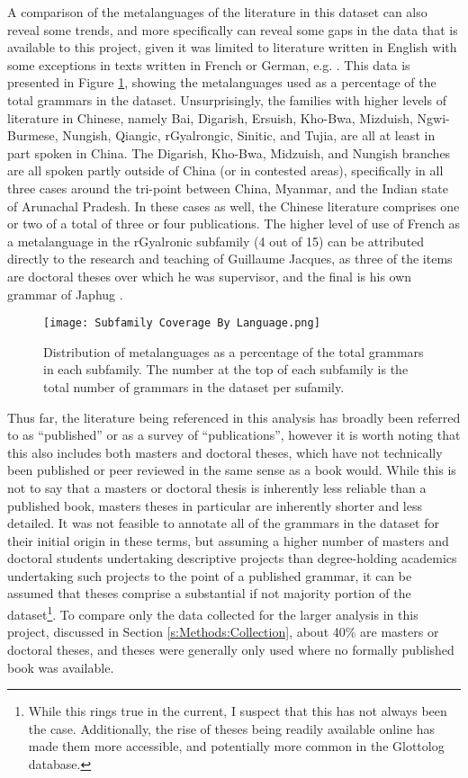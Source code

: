 A comparison of the metalanguages of the literature in this dataset can also reveal some trends, and more specifically can reveal some gaps in the data that is available to this project, given it was limited to literature written in English with some exceptions in texts written in French or German, e.g. . This data is presented in Figure \ref{f:Description:SubfamilyCoverageByLanguage}, showing the metalanguages used as a percentage of the total grammars in the dataset. Unsurprisingly, the families with higher levels of literature in Chinese, namely Bai, Digarish, Ersuish, Kho-Bwa, Mizduish, Ngwi-Burmese, Nungish, Qiangic, rGyalrongic, Sinitic, and Tujia, are all at least in part spoken in China. The Digarish, Kho-Bwa, Midzuish, and Nungish branches are all spoken partly outside of China (or in contested areas), specifically in all three cases around the tri-point between China, Myanmar, and the Indian state of Arunachal Pradesh. In these cases as well, the Chinese literature comprises one or two of a total of three or four publications. The higher level of use of French as a metalanguage in the rGyalronic subfamily (4 out of 15) can be attributed directly to the research and teaching of Guillaume Jacques, as three of the items are doctoral theses over which he was supervisor, and the final is his own grammar of Japhug \cite{Jacques2021}.

\begin{figure}
        \centering
        \texttt{[image: Subfamily Coverage By Language.png]}
        \caption{Distribution of metalanguages as a percentage of the total grammars in each subfamily. The number at the top of each subfamily is the total number of grammars in the dataset per sufamily.}\label{f:Description:SubfamilyCoverageByLanguage}
\end{figure}

Thus far, the literature being referenced in this analysis has broadly been referred to as ``published'' or as a survey of ``publications'', however it is worth noting that this also includes both masters and doctoral theses, which have not technically been published or peer reviewed in the same sense as a book would. While this is not to say that a masters or doctoral thesis is inherently less reliable than a published book, masters theses in particular are inherently shorter and less detailed. It was not feasible to annotate all of the grammars in the dataset for their initial origin in these terms, but assuming a higher number of masters and doctoral students undertaking descriptive projects than degree-holding academics undertaking such projects to the point of a published grammar, it can be assumed that theses comprise a substantial if not majority portion of the dataset\footnote{While this rings true in the current, I suspect that this has not always been the case. Additionally, the rise of theses being readily available online has made them more accessible, and potentially more common in the Glottolog database.}. To compare only the data collected for the larger analysis in this project, discussed in Section \ref{s:Methods:Collection}, about 40\% are masters or doctoral theses, and theses were generally only used where no formally published book was available.

